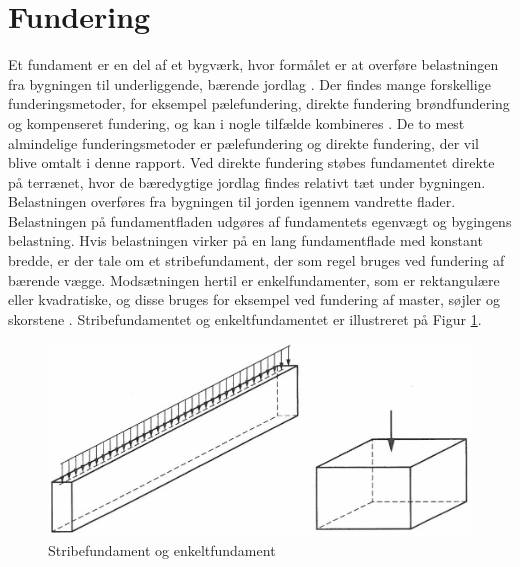 \section{Fundering}
Et fundament er en del af et bygværk, hvor formålet er at overføre belastningen fra bygningen til underliggende, bærende jordlag \citep[ s. 221]{geoteknik}. Der findes mange forskellige funderingsmetoder, for eksempel pælefundering, direkte fundering brøndfundering og kompenseret fundering, og kan i nogle tilfælde kombineres \citep{fundering}. De to mest almindelige funderingsmetoder er pælefundering og direkte fundering, der vil blive omtalt i denne rapport. 
\newline \indent{     }  Ved direkte fundering støbes fundamentet direkte på terrænet, hvor de bæredygtige jordlag findes relativt tæt under bygningen. Belastningen overføres fra bygningen til jorden igennem vandrette flader. Belastningen på fundamentfladen udgøres af fundamentets egenvægt og bygingens belastning. Hvis belastningen virker på en lang fundamentflade med konstant bredde, er der tale om et stribefundament, der som regel bruges ved fundering af bærende vægge. Modsætningen hertil er enkelfundamenter, som er rektangulære eller kvadratiske, og disse bruges for eksempel ved fundering af master, søjler og skorstene \citep[ s. 221]{geoteknik}. Stribefundamentet og enkeltfundamentet er illustreret på Figur \ref{fig:fundament}. 

\begin{figure}[htbp] \centering
	\begin{minipage}[b]{0.48\textwidth}\centering
		\includegraphics[width=1.0\textwidth]{billeder/fundament.png}
		\caption{Stribefundament og enkeltfundament \citep[ s. 221]{geoteknik}}
		\label{fig:fundament}
	\end{minipage}\hfill
\end{figure}

